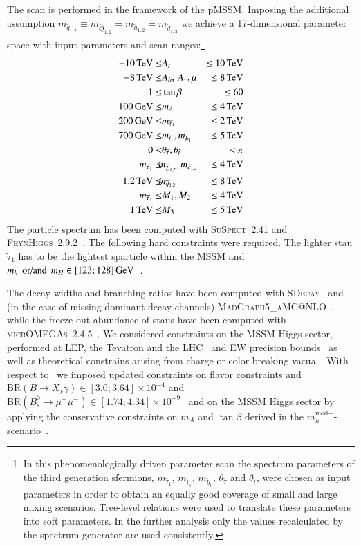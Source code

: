 \documentclass[preprint,number,sort&compress,twocolumn,3p]{elsstyarticle}
\def\bea{\begin{eqnarray}}
\def\eea{\end{eqnarray}}
\newcommand{\stau}{{\widetilde{\tau}}}
\newcommand{\mstau}{m_{\stau_1}}
\newcommand{\thest}{\theta_{\stau}}
\newcommand{\s}[1]{\widetilde{#1}}
\newcommand{\GEV}{\ensuremath{\,\textnormal{GeV}}}
\newcommand{\TEV}{\ensuremath{\,\textnormal{TeV}}}
\begin{document}
The scan is performed in the framework of the pMSSM.
Imposing the additional assumption
$ m_{\s q_{1,2}}\equiv m_{\s Q_{1,2}}=  m_{\s u_{1,2}}\!= m_{\s d_{1,2}}$ we
achieve a 17-dimensional parameter space with input parameters and scan ranges:\footnote{In this phenomenologically driven parameter scan the spectrum parameters of the third generation sfermions, 
$\mstau, \,m_{\tilde{t}_1}, \,m_{\tilde{b}_1}, \,\thest$ and $ \theta_{\tilde{t}}$, were 
chosen as input parameters in order to obtain an equally good
coverage of small and large mixing scenarios. Tree-level relations were used to translate these 
parameters into soft parameters. In the further analysis only the values recalculated by the spectrum 
generator are used consistently.}
\bea
-10\TEV \le &A_t &\le10\TEV \nonumber \\
-8\TEV \le &A_b,\,A_\tau, \mu& \le8\TEV \nonumber \\
1 \le & \tan\beta & \le 60 \nonumber \\
100\GEV \le &  m_A  & \le 4\TEV \nonumber \\
200\GEV \le & \mstau & \le 2\TEV \nonumber \\
700\GEV \le & m_{\tilde{t}_1}, m_{\tilde{b}_1} & \le 5\TEV \label{eq:scanranges}\\
0 < &  \thest, \theta_{\tilde{t}} & < \pi \nonumber \\
\mstau  \le & \!\!m_{\s L_{1,2}}, m_{\s e_{1,2}} \!\!& \le  4\TEV \nonumber \\
1.2\TEV\le & \!\!m_{\s q_{1,2}}\!\!
& \le  8\TEV \nonumber \\
\mstau  \le &  M_1, M_2 & \le  4\TEV \nonumber \\
1\TEV \le & M_3 & \le  5\TEV \nonumber 
\eea
The particle spectrum has been computed with \textsc{SuSpect}~2.41 \cite{Djouadi:2002ze}
and \textsc{FeynHiggs}~2.9.2~\cite{Heinemeyer:1998yj}. The following hard constraints were required. The 
lighter stau $\stau_1$ has to be the lightest sparticle within
the MSSM and $m_h\;\,\text{or/and} \;\,m_H \in [123;128]\GEV$~\cite{pdg,Degrassi:2002fi}.

The decay widths and branching ratios have been computed with 
\textsc{SDecay}~\cite{Djouadi:2006bz,Kraml:2007sx} and (in the case of missing dominant decay channels) \textsc{MadGraph5\_aMC@NLO}~\cite{Alwall:2014hca}, while
the freeze-out abundance of staus have been computed with \textsc{micrOMEGAs}~2.4.5~\cite{Belanger:2008sj}.
We considered constraints on the MSSM Higgs sector, performed at LEP, the Tevatron and the LHC~\cite{Bechtle:2011sb}
and EW precision bounds~\cite{Group:2012gb,Bechtle:2012jw,Heinemeyer:2006px} as well as
theoretical constrains arising from charge or color breaking vacua~\cite{Kitahara:2013lfa,Frere:1983ag,AlvarezGaume:1983gj,Claudson:1983et,Kounnas:1983td,Derendinger:1983bz}. With respect to~\cite{Heisig:2013rya} we
imposed updated constraints on flavor constraints and $\text{BR}(B\to X_s\gamma) \in [3.0;3.64]\times 10^{-4}$ 
\cite{Amhis:2016xyh} and 
$\text{BR}(B_s^0\to\mu^+\mu^-) \in [1.74;4.34] \times 10^{-9}$~\cite{Aaij:2017vad}
and on the MSSM Higgs sector by applying the conservative constraints on $m_A$ and $\tan\beta$
derived in the $m_h^{\text{mod}+}$-scenario~\cite{Sirunyan:2018zut}. 
\end{document}
